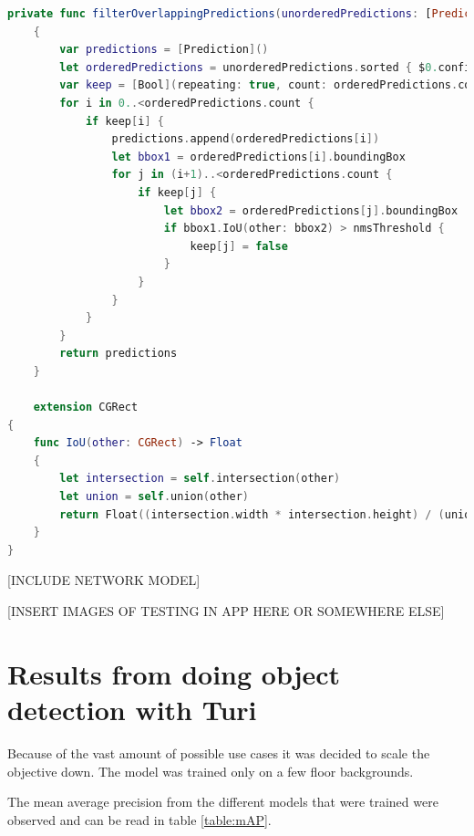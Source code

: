 \begin{lstlisting}[language=swift]
    private func filterOverlappingPredictions(unorderedPredictions: [Prediction], nmsThreshold: Float) -> [Prediction]
    {
        var predictions = [Prediction]()
        let orderedPredictions = unorderedPredictions.sorted { $0.confidence > $1.confidence }
        var keep = [Bool](repeating: true, count: orderedPredictions.count)
        for i in 0..<orderedPredictions.count {
            if keep[i] {
                predictions.append(orderedPredictions[i])
                let bbox1 = orderedPredictions[i].boundingBox
                for j in (i+1)..<orderedPredictions.count {
                    if keep[j] {
                        let bbox2 = orderedPredictions[j].boundingBox
                        if bbox1.IoU(other: bbox2) > nmsThreshold {
                            keep[j] = false
                        }
                    }
                }
            }
        }
        return predictions
    }
    
    extension CGRect
{
    func IoU(other: CGRect) -> Float
    {
        let intersection = self.intersection(other)
        let union = self.union(other)
        return Float((intersection.width * intersection.height) / (union.width * union.height))
    }
}
\end{lstlisting}



[INCLUDE NETWORK MODEL]

 [INSERT IMAGES OF TESTING IN APP HERE  OR SOMEWHERE ELSE] 



\section{Results from doing object detection with Turi}
Because of the vast amount of possible use cases it was decided to scale the objective down. The model was trained only on a few floor backgrounds. 

The mean average precision from the different models that were trained were observed and can be read in table \ref{table:mAP}. 

